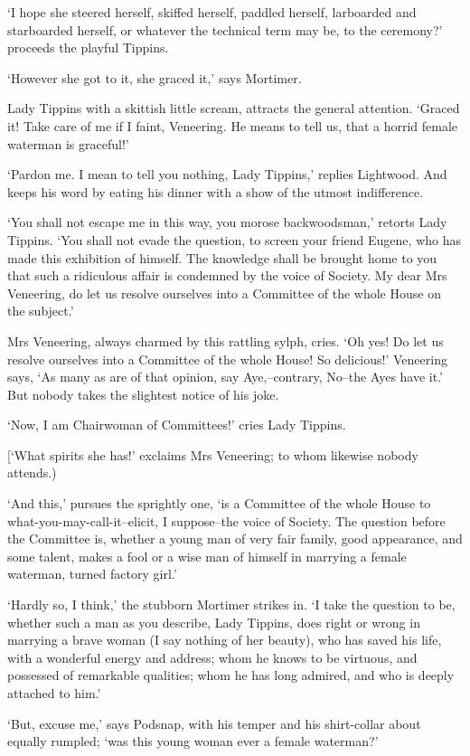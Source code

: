 ‘I hope she steered herself, skiffed herself, paddled herself,
larboarded and starboarded herself, or whatever the technical term may
be, to the ceremony?’ proceeds the playful Tippins.

‘However she got to it, she graced it,’ says Mortimer.

Lady Tippins with a skittish little scream, attracts the general
attention. ‘Graced it! Take care of me if I faint, Veneering. He means
to tell us, that a horrid female waterman is graceful!’

‘Pardon me. I mean to tell you nothing, Lady Tippins,’ replies
Lightwood. And keeps his word by eating his dinner with a show of the
utmost indifference.

‘You shall not escape me in this way, you morose backwoodsman,’ retorts
Lady Tippins. ‘You shall not evade the question, to screen your friend
Eugene, who has made this exhibition of himself. The knowledge shall be
brought home to you that such a ridiculous affair is condemned by the
voice of Society. My dear Mrs Veneering, do let us resolve ourselves
into a Committee of the whole House on the subject.’

Mrs Veneering, always charmed by this rattling sylph, cries. ‘Oh yes!
Do let us resolve ourselves into a Committee of the whole House!
So delicious!’ Veneering says, ‘As many as are of that opinion, say
Aye,--contrary, No--the Ayes have it.’ But nobody takes the slightest
notice of his joke.

‘Now, I am Chairwoman of Committees!’ cries Lady Tippins.

[‘What spirits she has!’ exclaims Mrs Veneering; to whom likewise nobody
attends.)

‘And this,’ pursues the sprightly one, ‘is a Committee of the whole
House to what-you-may-call-it--elicit, I suppose--the voice of Society.
The question before the Committee is, whether a young man of very fair
family, good appearance, and some talent, makes a fool or a wise man of
himself in marrying a female waterman, turned factory girl.’

‘Hardly so, I think,’ the stubborn Mortimer strikes in. ‘I take the
question to be, whether such a man as you describe, Lady Tippins, does
right or wrong in marrying a brave woman (I say nothing of her beauty),
who has saved his life, with a wonderful energy and address; whom he
knows to be virtuous, and possessed of remarkable qualities; whom he has
long admired, and who is deeply attached to him.’

‘But, excuse me,’ says Podsnap, with his temper and his shirt-collar
about equally rumpled; ‘was this young woman ever a female waterman?’

